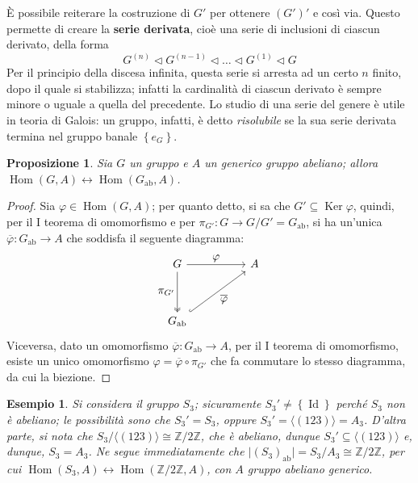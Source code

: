 \documentclass[11pt]{article}
\theoremstyle{style}
\newtheorem{esempio}{Esempio}[section]
\newtheorem{prop}{Proposizione}[section]
\numberwithin{equation}{subsection}
\renewcommand{\textbf}[1]{\textsf{\bfseries #1}}
\begin{document}
\noindent \`E possibile reiterare la costruzione di $G'$ per ottenere $(G')'$ e cos\`i via. 
Questo permette di creare la \textbf{serie derivata}, cio\`e una serie di inclusioni di ciascun derivato, della forma
\begin{equation}
	G^{(n)} \lhd G^{(n-1)} \lhd \ldots\lhd G^{(1)} \lhd G
\end{equation}
Per il principio della discesa infinita, questa serie si arresta ad un certo $n$ finito, dopo il quale si stabilizza; infatti la cardinalit\`a di ciascun derivato \`e sempre minore o uguale a quella del precedente.
Lo studio di una serie del genere \`e utile in teoria di Galois: un gruppo, infatti, \`e detto \textit{risolubile} se la sua serie derivata termina nel gruppo banale $\left\{ e_G \right\} $.

\begin{prop}
	Sia $G$ un gruppo e $A$ un generico gruppo abeliano; allora $\operatorname{Hom} (G,A) \longleftrightarrow \operatorname{Hom} (G_\text{ab},A)$.
\end{prop}
	\begin{proof}
		Sia $\varphi \in \operatorname{Hom} (G,A)$; per quanto detto, si sa che $G' \subseteq \operatorname{Ker} \varphi $, quindi, per il I teorema di omomorfismo e per $\pi_{G'}:G\to G / G' = G_\text{ab} $, si ha un'unica $\overline{\varphi }:G_\text{ab}\to A$ che soddisfa il seguente diagramma:
		\[
		\begin{tikzcd}
			G & & A \\
			\\
G_\text{ab}
\arrow[from=1-1, to=1-3,"\displaystyle \varphi"]
\arrow[from=1-1, to=3-1,"\displaystyle \pi_{G'} "',two heads]
\arrow[from=3-1, to=1-3, "\displaystyle \overline{\varphi }"',hook]
		\end{tikzcd}
		\] 
		Viceversa, dato un omomorfismo $\overline{\varphi }:G_\text{ab}\to A$, per il I teorema di omomorfismo, esiste un unico omomorfismo $\varphi = \overline{\varphi }\circ \pi_{G'} $ che fa commutare lo stesso diagramma, da cui la biezione.
	\end{proof}
\begin{esempio}
Si considera il gruppo $S_3$; sicuramente $S_3'\neq \left\{ \operatorname{Id}  \right\} $ perch\'e $S_3$ non \`e abeliano; le possibilit\`a sono che $S_3' = S_3$, oppure $S_3' = \langle (123) \rangle = A_3$.
D'altra parte, si nota che $S_3 / \langle (123) \rangle \cong \mathbb{Z}/2\mathbb{Z}$, che \`e abeliano, dunque $S_3' \subseteq \langle (123) \rangle$ e, dunque, $S_3 = A_3$.
Ne segue immediatamente che $\lvert (S_3)_\text{ab} \rvert = S_3 / A_3 \cong \mathbb{Z}/2\mathbb{Z}$, per cui $\operatorname{Hom} (S_3 , A) \longleftrightarrow \operatorname{Hom} (\mathbb{Z}/2\mathbb{Z},A)$, con $A$ gruppo abeliano generico.
\end{esempio}
\end{document}
